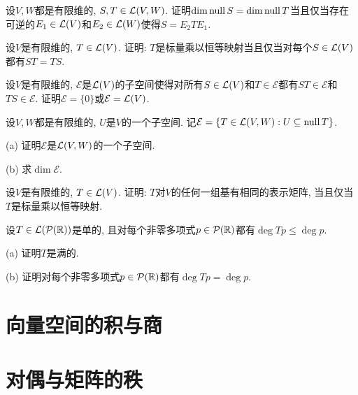 \begin{exercise} %
	设$V,W$都是有限维的, $S,T \in \mathcal{L} (V,W)$. 证明$\dim \operatorname{null} S = \dim \operatorname{null} T$当且仅当存在可逆的$E_1 \in \mathcal{L} (V)$和$E_2 \in \mathcal{L} (W)$使得$S=E_2TE_1$. 
\end{exercise}
\vspace{1em}

\begin{exercise} %
	设$V$是有限维的, $T \in \mathcal{L} (V)$. 证明: $T$是标量乘以恒等映射当且仅当对每个$S \in \mathcal{L} (V)$都有$ST=TS$. 
\end{exercise}
\vspace{1em}

\begin{exercise} %
	设$V$是有限维的, $\mathcal{E}$是$\mathcal{L} (V)$的子空间使得对所有$S \in \mathcal{L} (V)$和$T \in \mathcal{E}$都有$ST \in \mathcal{E}$和$TS \in \mathcal{E}$. 证明$\mathcal{E}=\{ 0 \}$或$\mathcal{E}=\mathcal{L} (V)$. 
\end{exercise}
\vspace{1em}

\begin{exercise} %
	设$V,W$都是有限维的, $U$是$V$的一个子空间. 记$\mathcal{E} = \{ T \in \mathcal{L} (V,W):U \subseteq \operatorname{null} T \}$. 
	
	(a) 证明$\mathcal{E}$是$\mathcal{L} (V,W)$的一个子空间. 
	
	(b) 求$\dim \mathcal{E}$. 
\end{exercise}
\vspace{1em}

\begin{exercise} %
	设$V$是有限维的, $T \in \mathcal{L} (V)$. 证明: $T$对$V$的任何一组基有相同的表示矩阵, 当且仅当$T$是标量乘以恒等映射. 
\end{exercise}
\vspace{1em}

\begin{exercise} %
	设$T \in \mathcal{L} (\mathcal{P} (\mathbb{R}))$是单的, 且对每个非零多项式$p \in \mathcal{P}(\mathbb{R})$都有$\deg Tp \leq \deg p$. 
	
	(a) 证明$T$是满的. 
	
	(b) 证明对每个非零多项式$p \in \mathcal{P}(\mathbb{R})$都有$\deg Tp = \deg p$. 
\end{exercise}


\newpage
\section{向量空间的积与商}



\section{对偶与矩阵的秩}






